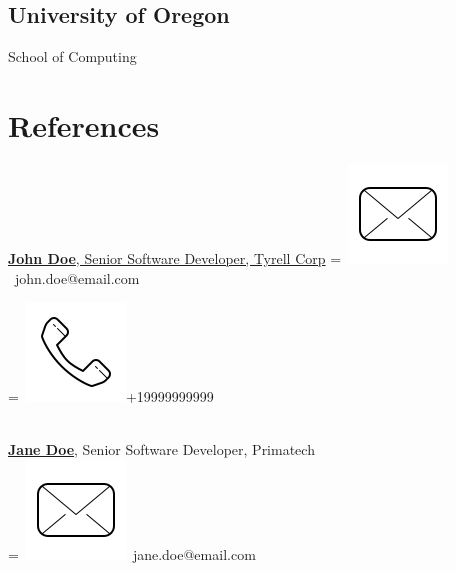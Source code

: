 \documentclass[]{plushcv}
\begin{document}
\begin{minipage}[t]{0.25\textwidth}
        \sectionsep
        \subsection{University of Oregon}
        School of Computing \\
        \sectionsep


        \section{References}
        \href{https://www.linkedin.com/company/john-doe/}{\textbf{John Doe}, Senior Software Developer, Tyrell Corp}
        \begingroup
        =\hbox{
            \includegraphics[scale=0.1,trim={0 1cm 0cm 0cm}]{icons/main/mail.png}\hspace{0.3cm} john.doe@email.com
        }
        \parbox{\wd0}{}
        \endgroup
        \begingroup
        =\hbox{
            \includegraphics[scale=0.1,trim={0 1.25cm -0.4cm 0cm}]{icons/main/phone.png}\hspace{0.3cm}+19999999999
        }
        \parbox{\wd0}{}\endgroup
        \\
        \sectionsep
        \href{https://www.linkedin.com/company/john-doe/}{\textbf{Jane Doe}}, Senior Software Developer, Primatech
        \\
        \begingroup
        =\hbox{
            \includegraphics[scale=0.1,trim={0 1cm 0cm 0cm}]{icons/main/mail.png}\hspace{0.3cm} jane.doe@email.com
}
\end{minipage}
\end{document}
